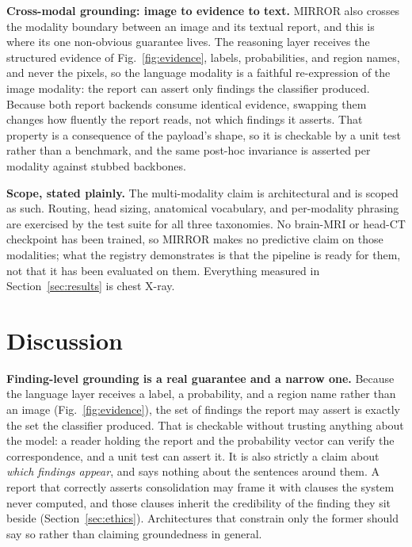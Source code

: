 \documentclass[conference]{IEEEtran}
\newcommand{\rih}[1]{\textbf{#1}\enspace\ignorespaces}
\begin{document}
\rih{Cross-modal grounding: image to evidence to text.} MIRROR also crosses the
modality boundary between an image and its textual report, and this is where its one
non-obvious guarantee lives. The reasoning layer receives the structured evidence of
Fig.~\ref{fig:evidence}, labels, probabilities, and region names, and never the
pixels, so the language modality is a faithful re-expression of the image modality:
the report can assert only findings the classifier produced. Because both report
backends consume identical evidence, swapping them changes how fluently the report
reads, not which findings it asserts. That property is a consequence of the payload's
shape, so it is checkable by a unit test rather than a benchmark, and the same
post-hoc invariance is asserted per modality against stubbed backbones.

\rih{Scope, stated plainly.} The multi-modality claim is architectural and is scoped
as such. Routing, head sizing, anatomical vocabulary, and per-modality phrasing are
exercised by the test suite for all three taxonomies. No brain-MRI or head-CT
checkpoint has been trained, so MIRROR makes no predictive claim on those modalities;
what the registry demonstrates is that the pipeline is ready for them, not that it
has been evaluated on them. Everything measured in Section~\ref{sec:results} is chest
X-ray.

\section{Discussion}
\label{sec:discussion}

\rih{Finding-level grounding is a real guarantee and a narrow one.} Because the
language layer receives a label, a probability, and a region name rather than an
image (Fig.~\ref{fig:evidence}), the set of findings the report may assert is
exactly the set the classifier produced. That is checkable without trusting anything
about the model: a reader holding the report and the probability vector can verify
the correspondence, and a unit test can assert it. It is also strictly a claim about
\emph{which findings appear}, and says nothing about the sentences around them. A
report that correctly asserts consolidation may frame it with clauses the system
never computed, and those clauses inherit the credibility of the finding they sit
beside (Section~\ref{sec:ethics}). Architectures that constrain only the former
should say so rather than claiming groundedness in general.
\end{document}
